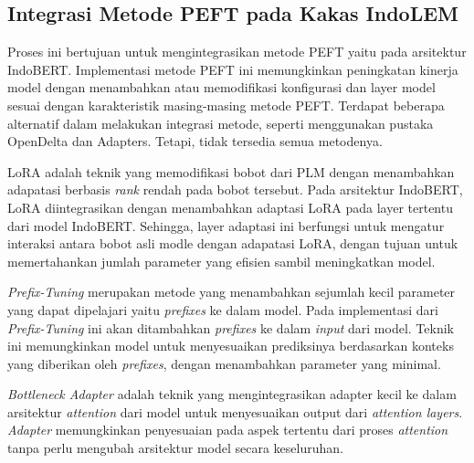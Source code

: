 \subsection{Integrasi Metode PEFT pada Kakas IndoLEM}

Proses ini bertujuan untuk mengintegrasikan metode PEFT yaitu \methodPEFT pada arsitektur IndoBERT. Implementasi metode PEFT ini memungkinkan peningkatan kinerja model dengan menambahkan atau memodifikasi konfigurasi dan layer model sesuai dengan karakteristik masing-masing metode PEFT. Terdapat beberapa alternatif dalam melakukan integrasi metode, seperti menggunakan pustaka OpenDelta dan Adapters. Tetapi, tidak tersedia semua metodenya.

LoRA adalah teknik yang memodifikasi bobot dari PLM  dengan menambahkan adapatasi berbasis \textit{rank} rendah pada bobot tersebut. Pada arsitektur IndoBERT, LoRA diintegrasikan dengan menambahkan adaptasi LoRA pada layer tertentu dari model IndoBERT. Sehingga, layer adaptasi ini berfungsi untuk mengatur interaksi antara bobot asli modle dengan adapatasi LoRA, dengan tujuan untuk memertahankan jumlah parameter yang efisien sambil meningkatkan model.

\textit{Prefix-Tuning} merupakan metode yang menambahkan sejumlah kecil parameter yang dapat dipelajari yaitu \textit{prefixes} ke dalam model. Pada implementasi dari \textit{Prefix-Tuning} ini akan ditambahkan \textit{prefixes} ke dalam \textit{input} dari model. Teknik ini memungkinkan model untuk menyesuaikan prediksinya berdasarkan konteks yang diberikan oleh \textit{prefixes}, dengan menambahkan parameter yang minimal. 

\textit{Bottleneck Adapter} adalah teknik yang mengintegrasikan adapter kecil ke dalam arsitektur \textit{attention} dari model untuk menyesuaikan output dari \textit{attention layers}. \textit{Adapter} memungkinkan penyesuaian pada aspek tertentu dari proses \textit{attention} tanpa perlu mengubah arsitektur model secara keseluruhan.

